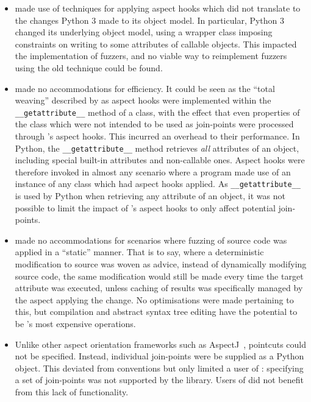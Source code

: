 \begin{itemize}
    \item \pydysofu made use of techniques
      for applying aspect hooks which did not translate to the changes Python 3
      made to its object model. In particular, Python 3 changed its underlying
      object model, using a wrapper class imposing constraints on writing to
      some attributes of callable objects. This impacted the implementation of
      fuzzers, and no viable way to reimplement fuzzers using the old technique
      could be found.
    \item \pydysofu{} made no accommodations for
      efficiency. It could be seen as the ``total weaving'' described by
      \citet{dynamicAOchitchyan} as aspect hooks were implemented within the
      \lstinline{__getattribute__} method of a class, with the effect that even
      properties of the class which were not intended to be used as join-points
      were processed through \pydysofu{}'s aspect hooks. This incurred an overhead
      to their performance. In Python, the \lstinline{__getattribute__} method
      retrieves \emph{all} attributes of an object, including special built-in
      attributes and non-callable ones. Aspect hooks were therefore invoked in
      almost any scenario where a program made use of an instance of any class
      which had aspect hooks applied. As \lstinline{__getattribute__} is used by
      Python when retrieving any attribute of an object, it was not possible to
      limit the impact of \pydysofu{}'s aspect hooks to only affect potential
      join-points.
    \item \pydysofu made no accommodations for scenarios
      where fuzzing of source code was applied in a ``static'' manner. That is
      to say, where a deterministic modification to source was woven as advice,
      instead of dynamically modifying source code, the same modification would
      still be made every time the target attribute was executed, unless caching
      of results was specifically managed by the aspect applying the change. No
      optimisations were made pertaining to this, but compilation and abstract
      syntax tree editing have the potential to be \pydysofu{}'s most expensive
      operations.
    \item Unlike other aspect orientation frameworks such as
      AspectJ~\cite{aspectj_intro}, pointcuts could not be specified. Instead,
      individual join-points were be supplied as a Python object. This deviated
      from \aop{} conventions but only limited a user of \pydysofu{}: specifying a
      set of join-points was not supported by the library. Users of \pydysofu{} did
      not benefit from this lack of functionality.
\end{itemize}

